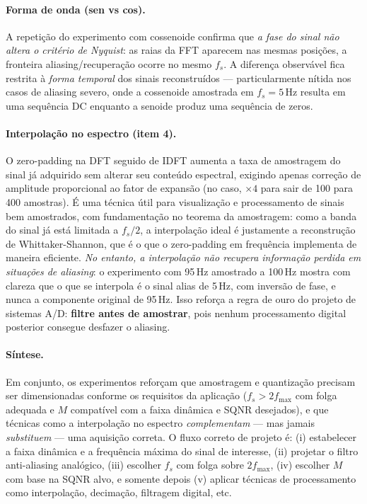 \documentclass[12pt]{article}
\begin{document}
\paragraph{Forma de onda (sen vs cos).} A repetição do experimento com cossenoide confirma que \emph{a fase do sinal não altera o critério de Nyquist}: as raias da FFT aparecem nas mesmas posições, a fronteira aliasing/recuperação ocorre no mesmo $f_s$. A diferença observável fica restrita à \emph{forma temporal} dos sinais reconstruídos — particularmente nítida nos casos de aliasing severo, onde a cossenoide amostrada em $f_s = 5$\,Hz resulta em uma sequência DC enquanto a senoide produz uma sequência de zeros.

\paragraph{Interpolação no espectro (item 4).} O zero-padding na DFT seguido de IDFT aumenta a taxa de amostragem do sinal já adquirido sem alterar seu conteúdo espectral, exigindo apenas correção de amplitude proporcional ao fator de expansão (no caso, $\times 4$ para sair de 100 para 400 amostras). É uma técnica útil para visualização e processamento de sinais bem amostrados, com fundamentação no teorema da amostragem: como a banda do sinal já está limitada a $f_s/2$, a interpolação ideal é justamente a reconstrução de Whittaker-Shannon, que é o que o zero-padding em frequência implementa de maneira eficiente. \emph{No entanto, a interpolação não recupera informação perdida em situações de aliasing}: o experimento com 95\,Hz amostrado a 100\,Hz mostra com clareza que o que se interpola é o sinal alias de 5\,Hz, com inversão de fase, e nunca a componente original de 95\,Hz. Isso reforça a regra de ouro do projeto de sistemas A/D: \textbf{filtre antes de amostrar}, pois nenhum processamento digital posterior consegue desfazer o aliasing.

\paragraph{Síntese.} Em conjunto, os experimentos reforçam que amostragem e quantização precisam ser dimensionadas conforme os requisitos da aplicação ($f_s > 2f_{\max}$ com folga adequada e $M$ compatível com a faixa dinâmica e SQNR desejados), e que técnicas como a interpolação no espectro \emph{complementam} — mas jamais \emph{substituem} — uma aquisição correta. O fluxo correto de projeto é: (i) estabelecer a faixa dinâmica e a frequência máxima do sinal de interesse, (ii) projetar o filtro anti-aliasing analógico, (iii) escolher $f_s$ com folga sobre $2f_{\max}$, (iv) escolher $M$ com base na SQNR alvo, e somente depois (v) aplicar técnicas de processamento como interpolação, decimação, filtragem digital, etc.
\end{document}
